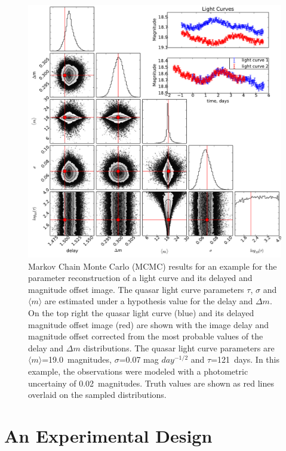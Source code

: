 \documentclass{emulateapj}
\begin{document}
\begin{figure}[t]
\begin{center}
\includegraphics[width=\linewidth]{./triangle_example_2.pdf}
\caption{
  Markov Chain Monte Carlo (MCMC) results for an example for
  the parameter reconstruction of a light curve and its delayed and
  magnitude offset image. The quasar light curve parameters $\tau$,
  $\sigma$ and $\langle m \rangle$ are estimated under a hypothesis
  value for the delay and $\Delta m$. On the top right the quasar
  light curve (blue) and its delayed magnitude offset image (red) are
  shown with the image delay and magnitude offset corrected from the
  most probable values of the delay and $\Delta m$
  distributions. The quasar light curve parameters are 
  $\langle m \rangle$=19.0~magnitudes, $\sigma$=0.07 mag $day^{-1/2}$
  and $\tau$=121~days. In this example, the observations were modeled
  with a photometric uncertainy of 0.02~magnitudes. Truth values are 
  shown as red lines overlaid on the sampled distributions.}\label{fig:triangle}
\end{center}
\end{figure}

\section{An Experimental Design}\label{sec:experiment}
\end{document}
